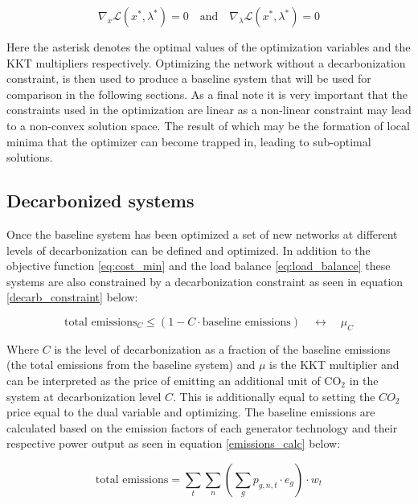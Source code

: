 \documentclass[preprint,12pt,nopreprintline]{elsarticle}
\begin{document}
\begin{equation}
\nabla_x \mathcal{L}(x^*, \lambda^*) = 0
\quad\text{and}\quad
\nabla_{\lambda} \mathcal{L}(x^*, \lambda^*) =
0
\label{KKT_conditions}
\end{equation}

\medskip
\noindent
Here the asterisk denotes the optimal values of the optimization variables and the KKT multipliers respectively. Optimizing the network without a decarbonization constraint, is then used to produce a baseline system that will be used for comparison in the following sections. As a final note it is very important that the constraints used in the optimization are linear as a non-linear constraint may lead to a non-convex solution space. The result of which may be the formation of local minima that the optimizer can become trapped in, leading to sub-optimal solutions.

\subsection{Decarbonized systems}
\noindent
Once the baseline system has been optimized a set of new networks at different levels of decarbonization can be defined and optimized. In addition to the objective function \eqref{eq:cost_min} and the load balance \eqref{eq:load_balance} these systems are also constrained by a decarbonization constraint as seen in equation \eqref{decarb_constraint} below:

\begin{equation}
\text{total emissions}_{C} \leq (1 - C \cdot \text{baseline emissions})
\quad\longleftrightarrow\quad \mu_{C}
\label{decarb_constraint}
\end{equation}

\medskip
\noindent
Where $C$ is the level of decarbonization as a fraction of the baseline emissions (the total emissions from the baseline system) and $\mu$ is the KKT multiplier and can be interpreted as the price of emitting an additional unit of CO$_2$ in the system at decarbonization level $C$. This is additionally equal to setting the $CO_2$ price equal to the dual variable and optimizing.  The baseline emissions are calculated based on the emission factors of each generator technology and their respective power output as seen in equation \eqref{emissions_calc} below:

\begin{equation}
\text{total emissions}
=
\sum_{t} \sum_{n} \left( \sum_{g} p_{g,n,t} \cdot e_g \right) \cdot w_t
\label{emissions_calc}
\end{equation}
\end{document}
